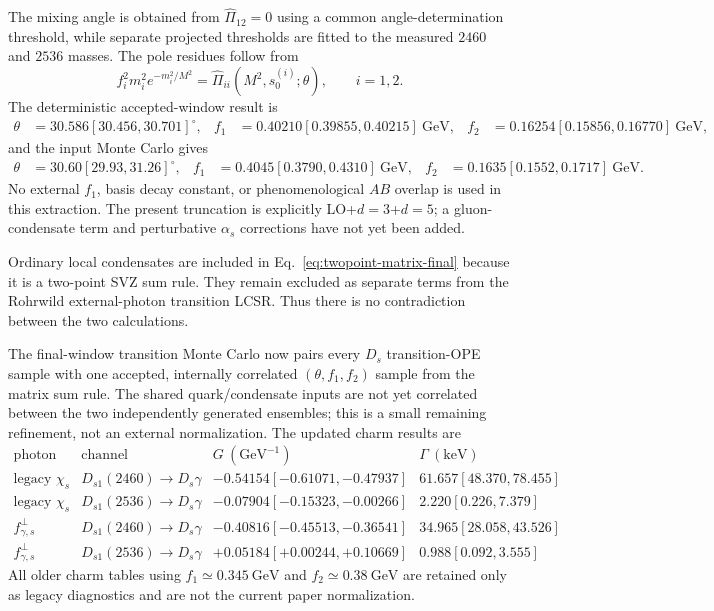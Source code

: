 \documentclass[11pt]{article}
\newcommand{\GeV}{\mathrm{GeV}}
\begin{document}
The mixing angle is obtained from $\widehat\Pi_{12}=0$ using a common
angle-determination threshold, while separate projected thresholds are fitted
to the measured $2460$ and $2536$ masses.  The pole residues follow from
\begin{equation}
f_i^2m_i^2e^{-m_i^2/M^2}
=\widehat\Pi_{ii}(M^2,s_0^{(i)};\theta),\qquad i=1,2.
\end{equation}
The deterministic accepted-window result is
\begin{align}
\theta&=30.586[30.456,30.701]^\circ,&
f_1&=0.40210[0.39855,0.40215]~\GeV,&
f_2&=0.16254[0.15856,0.16770]~\GeV,
\end{align}
and the input Monte Carlo gives
\begin{align}
\theta&=30.60[29.93,31.26]^\circ,&
f_1&=0.4045[0.3790,0.4310]~\GeV,&
f_2&=0.1635[0.1552,0.1717]~\GeV.
\end{align}
No external $f_1$, basis decay constant, or phenomenological $AB$ overlap is
used in this extraction.  The present truncation is explicitly
LO+$d=3$+$d=5$; a gluon-condensate term and perturbative $\alpha_s$
corrections have not yet been added.

Ordinary local condensates are included in Eq.~\eqref{eq:twopoint-matrix-final}
because it is a two-point SVZ sum rule.  They remain excluded as separate
terms from the Rohrwild external-photon transition LCSR.  Thus there is no
contradiction between the two calculations.

The final-window transition Monte Carlo now pairs every $D_s$ transition-OPE
sample with one accepted, internally correlated $(\theta,f_1,f_2)$ sample
from the matrix sum rule.  The shared quark/condensate inputs are not yet
correlated between the two independently generated ensembles; this is a
small remaining refinement, not an external normalization.  The updated
charm results are
\begin{equation}
\begin{array}{c|c|cc}
\text{photon input}&\text{channel}&G~(\GeV^{-1})&\Gamma~(\mathrm{keV})\\
\hline
\text{legacy }\chi_s&D_{s1}(2460)\to D_s\gamma
&-0.54154[-0.61071,-0.47937]&61.657[48.370,78.455]\\
\text{legacy }\chi_s&D_{s1}(2536)\to D_s\gamma
&-0.07904[-0.15323,-0.00266]&2.220[0.226,7.379]\\
f_{\gamma,s}^{\perp}&D_{s1}(2460)\to D_s\gamma
&-0.40816[-0.45513,-0.36541]&34.965[28.058,43.526]\\
f_{\gamma,s}^{\perp}&D_{s1}(2536)\to D_s\gamma
&+0.05184[+0.00244,+0.10669]&0.988[0.092,3.555]
\end{array}
\end{equation}
All older charm tables using $f_1\simeq0.345~\GeV$ and
$f_2\simeq0.38~\GeV$ are retained only as legacy diagnostics and are not the
current paper normalization.
\end{document}
